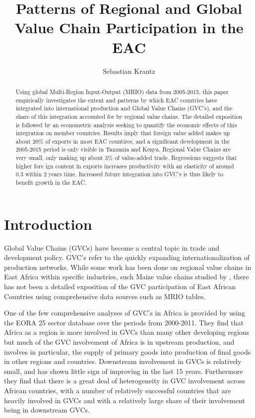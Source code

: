 \documentclass[a4paper]{article}
\title{\textbf{Patterns of Regional and Global Value Chain Participation in the EAC}}
\author{Sebastian Krantz}
\begin{document}
\maketitle

\begin{abstract}
Using global Multi-Region Input-Output (MRIO) data from 2005-2015, this paper empirically investigates the extent and patterns by which EAC countries have integrated into international production and Global Value Chains (GVC's), and the share of this integration accounted for by regional value chains. The detailed exposition is followed by an econometric analysis seeking to quantify the economic effects of this integration on member countries. Results imply that foreign value added makes up about 20\% of exports in most EAC countires, and a significant development in the 2005-2015 period is only visible in Tanzania and Kenya. Regional Value Chains are very small, only making up about 3\% of value-added trade. Regressions suggests that higher fore ign content in exports increases productivity with an elasticity of around 0.3 within 2 years time. Increased future integration into GVC's is thus likely to benefit growth in the EAC.    
\end{abstract}
\tableofcontents
\newpage
\listoftables
\listoffigures
\newpage

\section{Introduction}

Global Value Chains (GVCs) have become a central topic in trade and development policy. GVC's refer to the quickly expanding internationalization of production networks. While some work has been done on regional value chains in East Africa within specific industries, such Maize value chains studied by \citet{daly2016maize}, there has not been a detailed exposition of the GVC participation of East African Countries using comprehensive data sources such as MRIO tables. \newline

One of the few comprehensive analyses of GVC's in Africa is provided by \citet{foster2015global} using the EORA 25 sector database over the periods from 2000-2011. %
They find that Africa as a region is more involved in GVCs than many other developing regions but much of the GVC involvement of Africa is in upstream production, and involves in particular, the supply of primary goods into production of final goods in other regions and countries. Downstream involvement in GVCs is relatively small, and has shown little sign of improving in the last 15 years. Furthermore they find that there is a great deal of heterogeneity in GVC involvement across African countries, with a number of relatively successful countries that are heavily involved in GVCs and with a relatively large share of their involvement being in downstream GVCs. \newline
\end{document}
